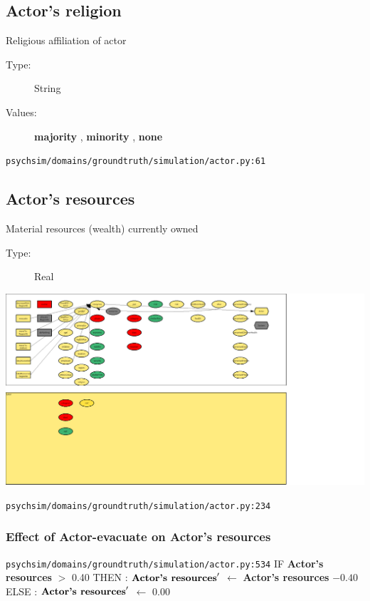 \documentclass{article}%
\begin{document}
%
\subsection{Actor's religion}%
\label{subsec:Actor's religion}%
Religious affiliation of actor%
\begin{description}%
\item[Type:]%
String%
\item[Values:]%
\textbf{majority}%
, %
\textbf{minority}%
, %
\textbf{none}%
\end{description}%
\begin{flushleft}%
\verb|psychsim/domains/groundtruth/simulation/actor.py:61|%
\end{flushleft}

%
\subsection{Actor's resources}%
\label{subsec:Actor's resources}%
Material resources (wealth) currently owned%
\begin{description}%
\item[Type:]%
Real%
\end{description}%
\includegraphics[width=\textwidth]{images/resourcesOfActor.png}%
\begin{flushleft}%
\verb|psychsim/domains/groundtruth/simulation/actor.py:234|%
\end{flushleft}%
\subsubsection{Effect of Actor{-}evacuate on Actor's resources}%
\label{ssubsec:Effect of Actor{-}evacuate on Actor's resources}%
\begin{flushleft}%
\verb|psychsim/domains/groundtruth/simulation/actor.py:534|%
\linebreak%
IF %
\textbf{Actor's resources}%
$>$%
0.40%
\linebreak%
\hspace*{2em}%
THEN %
: %
$\mbox{\textbf{Actor's resources}} '$%
$\leftarrow$%
\textbf{Actor's resources}%
${-}0.40$%
\linebreak%
\hspace*{2em}%
ELSE %
: %
$\mbox{\textbf{Actor's resources}} '$%
$\leftarrow$%
0.00%
\end{flushleft}
\end{document}
